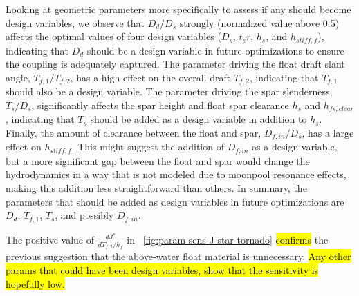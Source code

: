 Looking at geometric parameters more specifically to assess if any should become design variables, we observe that $D_d/D_s$ strongly (normalized value above 0.5) affects the optimal values of four design variables ($D_s$, $t_sr$, $h_s$, and $h_{stiff,f}$), indicating that $D_d$ should be a design variable in future optimizations to ensure the coupling is adequately captured.
The parameter driving the float draft slant angle, $T_{f,1}/T_{f,2}$, has a high effect on the overall draft $T_{f,2}$, indicating that $T_{f,1}$ should also be a design variable.
The parameter driving the spar slenderness, $T_s/D_s$, significantly affects the spar height and float spar clearance $h_s$ and $h_{fs,clear}$, indicating that $T_s$ should be added as a design variable in addition to $h_s$.
Finally, the amount of clearance between the float and spar, $D_{f,in}/D_s$, has a large effect on  $h_{stiff,f}$.
This might suggest the addition of $D_{f,in}$ as a design variable, but a more significant gap between the float and spar would change the hydrodynamics in a way that is not modeled due to moonpool resonance effects, making this addition less straightforward than others. 
In summary, the parameters that should be added as design variables in future optimizations are $D_d$, $T_{f,1}$, $T_s$, and possibly $D_{f,in}$.



The positive value of $\frac{dJ^*}{dT_{f,2}/h_f}$ in \figureautorefname~\ref{fig:param-sens-J-star-tornado} \hl{confirms} the previous suggestion that the above-water float material is unnecessary.
\hl{Any other params that could have been design variables, show that the sensitivity is hopefully low.}


